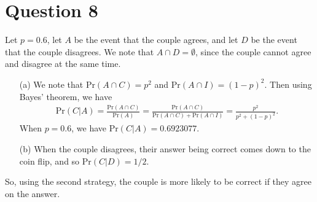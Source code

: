 \documentclass[10pt]{article}
\begin{document}
\section{Question 8} \noindent
Let \(p = 0.6\), let \(A\) be the event that the couple agrees, and let \(D\) be the event that the couple disagrees. We note that \(A \cap D = \emptyset\), 
since the couple cannot agree and disagree at the same time. 
\begin{itemize}
    \item[(a)] We note that \(\mathrm{Pr}(A \cap C) = p^2\) and \(\mathrm{Pr}(A \cap I) = (1-p)^2\). Then using Bayes' theorem, we have 
    \begin{align*}
        \mathrm{Pr}(C | A) = \frac{\mathrm{Pr}(A \cap C)}{\mathrm{Pr}(A)} = \frac{\mathrm{Pr}(A \cap C)}{\mathrm{Pr}(A \cap C) + \mathrm{Pr}(A \cap I)} 
        = \frac{p^2}{p^2 + (1-p)^2}.
    \end{align*}
    When \(p = 0.6\), we have \(\mathrm{Pr}(C | A) = 0.6923077\).
    \item[(b)] When the couple disagrees, their answer being correct comes down to the coin flip, and so \(\mathrm{Pr}(C | D) = 1/2\). 
\end{itemize}
So, using the second strategy, the couple is more likely to be correct if they agree on the answer. 
\end{document}
